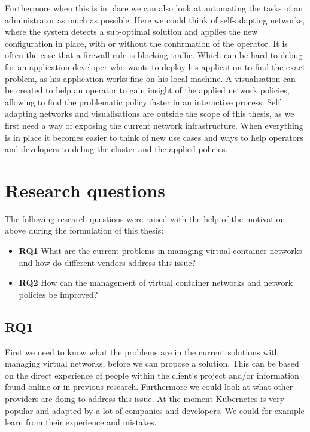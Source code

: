 Furthermore when this is in place we can also look at automating the tasks of an administrator as much as possible. Here we could think of self-adapting networks, where the system detects a sub-optimal solution and applies the new configuration in place, with or without the confirmation of the operator. It is often the case that a firewall rule is blocking traffic. Which can be hard to debug for an application developer who wants to deploy his application to find the exact problem, as his application works fine on his local machine. A visualisation can be created to help an operator to gain insight of the applied network policies, allowing to find the problematic policy faster in an interactive process. Self adapting networks and visualisations are outside the scope of this thesis, as we first need a way of exposing the current network infrastructure. When everything is in place it becomes easier to think of new use cases and ways to help operators and developers to debug the cluster and the applied policies.

\section{Research questions}
\label{sec:research-questions}
The following research questions were raised with the help of the motivation above during the formulation of this thesis:
\begin{itemize}
    \item \textbf{RQ1} What are the current problems in managing virtual container networks and how do different vendors address this issue?
    \item \textbf{RQ2} How can the management of virtual container networks and network policies be improved?   
\end{itemize}

\subsection{RQ1}
\label{subsec:rq1}
First we need to know what the problems are in the current solutions with managing virtual networks, before we can propose a solution. This can be based on the direct experience of people within the client's project and/or information found online or in previous research. Furthermore we could look at what other providers are doing to address this issue. At the moment Kubernetes is very popular and adapted by a lot of companies and developers. We could for example learn from their experience and mistakes.

